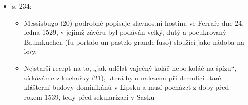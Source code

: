 \begin{itemize}
\begin{itemize}
    \begin{itemize}
    \tightlist
    \item
      Už v 16. století existují zmínky o tzv. „vaječných koláčích na
      rožni`` (Eierkuchen am Spieß), které se připravovaly v bohatších
      domácnostech a zejména v klášterech.
    \item
      Již před rokem 1500 však musela mít výroba dortovitého
      „Ayerkuchen", „Eyerkuchen" nebo „Spilkuchen" velký rozsah. Těsto
      se sice ještě jako u chlebového typu ovíjelo v tenkých pramenech
      spirálovitě kolem špalku nebo dřeva, „které k tomu bylo vyrobeno",
      ale těsto již dostávalo přídavky smetany nebo másla a postupně i
      více koření.
    \item
      obrázek stroje na automatický otáčení rožňů z knihy Scappiho
    \end{itemize}
  \item
    s. 234:

    \begin{itemize}
    \tightlist
    \item
      Messisbugo (20) podrobně popisuje slavnostní hostinu ve Ferraře
      dne 24. ledna 1529, v jejímž závěru byl podáván velký, dutý a
      pocukrovaný Baumkuchen (fu portato un pastelo grande fuso)
      sloužící jako nádoba na losy.
    \item
      Nejstarší recept na to, „jak udělat vaječný koláč nebo koláč na
      špízu``, získáváme z kuchařky (21), která byla nalezena při
      demolici staré klášterní budovy dominikánů v Lipsku a musí
      pocházet z doby před rokem 1539, tedy před sekularizací v Sasku.


\end{itemize}
\end{itemize}
\end{itemize}
